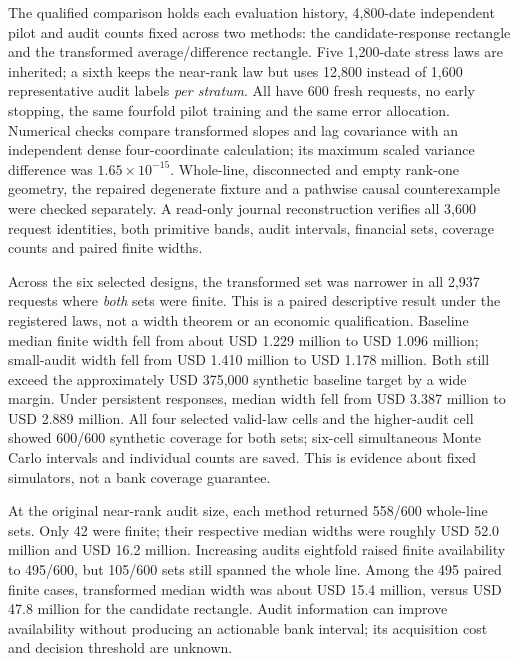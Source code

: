 \documentclass[11pt,a4paper]{article}
\begin{document}
The qualified comparison holds each evaluation history, 4,800-date independent
pilot and audit counts fixed across two methods: the candidate-response
rectangle and the transformed average/difference rectangle. Five 1,200-date
stress laws are inherited; a sixth keeps the near-rank law but uses 12,800
instead of 1,600 representative audit labels \emph{per stratum}. All have
600 fresh requests, no early stopping, the same fourfold pilot training and
the same error allocation. Numerical checks compare transformed slopes and
lag covariance with an independent dense four-coordinate calculation; its
maximum scaled variance difference was $1.65\times10^{-15}$. Whole-line,
disconnected and empty rank-one geometry, the repaired degenerate fixture and
a pathwise causal counterexample were checked separately. A read-only journal
reconstruction verifies all 3,600 request identities, both primitive bands,
audit intervals, financial sets, coverage counts and paired finite widths.



Across the six selected designs, the transformed set was narrower in all
2,937 requests where \emph{both} sets were finite. This is a paired descriptive
result under the registered laws, not a width theorem or an economic
qualification. Baseline median finite width fell from about USD 1.229 million
to USD 1.096 million; small-audit width fell from USD 1.410 million to
USD 1.178 million. Both still exceed the approximately USD 375,000 synthetic
baseline target by a wide margin. Under persistent responses, median width
fell from USD 3.387 million to USD 2.889 million. All four selected valid-law
cells and the higher-audit cell showed 600/600 synthetic coverage for both
sets; six-cell simultaneous Monte Carlo intervals and individual counts are
saved. This is evidence about fixed simulators, not a bank coverage guarantee.

At the original near-rank audit size, each method returned 558/600 whole-line
sets. Only 42 were finite; their respective median widths were roughly
USD 52.0 million and USD 16.2 million. Increasing audits eightfold raised
finite availability to 495/600, but 105/600 sets still spanned the whole line.
Among the 495 paired finite cases, transformed median width was about
USD 15.4 million, versus USD 47.8 million for the candidate rectangle. Audit
information can improve availability without producing an actionable bank
interval; its acquisition cost and decision threshold are unknown.
\end{document}
